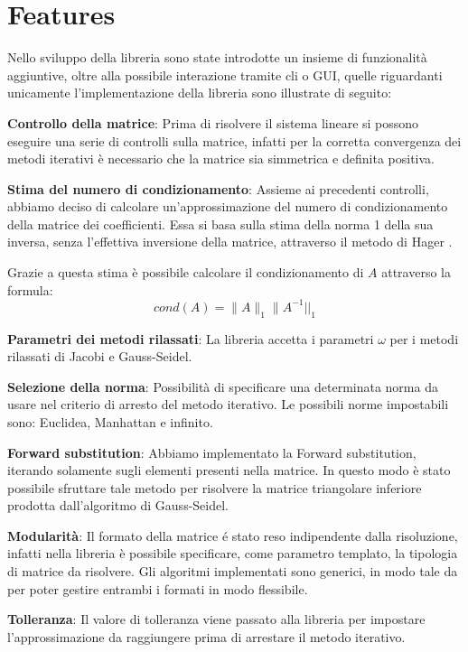 \section{Features}

Nello sviluppo della libreria sono state introdotte un insieme di funzionalità aggiuntive, oltre alla possibile interazione tramite cli o GUI, quelle riguardanti unicamente l'implementazione della libreria sono illustrate di seguito:

\begin{itemize}
	\begin{item}
		\textbf{Controllo della matrice}: Prima di risolvere il sistema lineare si possono eseguire una serie di controlli sulla matrice, infatti per la corretta convergenza dei metodi iterativi è necessario che la matrice sia simmetrica e definita positiva.
	\end{item}
	\begin{item}
		\textbf{Stima del numero di condizionamento}: Assieme ai precedenti controlli, abbiamo deciso di calcolare un'approssimazione del numero di condizionamento della matrice dei coefficienti. Essa si basa sulla stima della norma 1 della sua inversa, senza l'effettiva inversione della matrice, attraverso il metodo di Hager \cite{hager, hager2}.
		
		Grazie a questa stima è possibile calcolare il condizionamento di $A$ attraverso la formula:
		$$ cond(A) = \|A\|_1  \|A^{-1}||_1$$
			
			\end{item}
	\begin{item}
		\textbf{Parametri dei metodi rilassati}: La libreria accetta i parametri $\omega$ per i metodi rilassati di Jacobi e Gauss-Seidel.
	\end{item}
	\begin{item}
		\textbf{Selezione della norma}: Possibilità di specificare una determinata norma da usare nel criterio di arresto del metodo iterativo. Le possibili norme impostabili sono: Euclidea, Manhattan e infinito.
	\end{item}
	\begin{item}
		\textbf{Forward substitution}: Abbiamo implementato la Forward substitution, iterando solamente sugli elementi presenti nella matrice. In questo modo è stato possibile sfruttare tale metodo per risolvere la matrice triangolare inferiore prodotta dall'algoritmo di Gauss-Seidel.
	\end{item}
	\begin{item}
		\textbf{Modularità}: Il formato della matrice é stato reso indipendente dalla risoluzione, infatti nella libreria è possibile specificare, come parametro templato, la tipologia di matrice da risolvere. Gli algoritmi implementati sono generici, in modo tale da per poter gestire entrambi i formati in modo flessibile.
	\end{item}
	\begin{item}
		\textbf{Tolleranza}: Il valore di tolleranza viene passato alla libreria per impostare l'approssimazione da raggiungere prima di arrestare il metodo iterativo.
	\end{item}

\end{itemize}